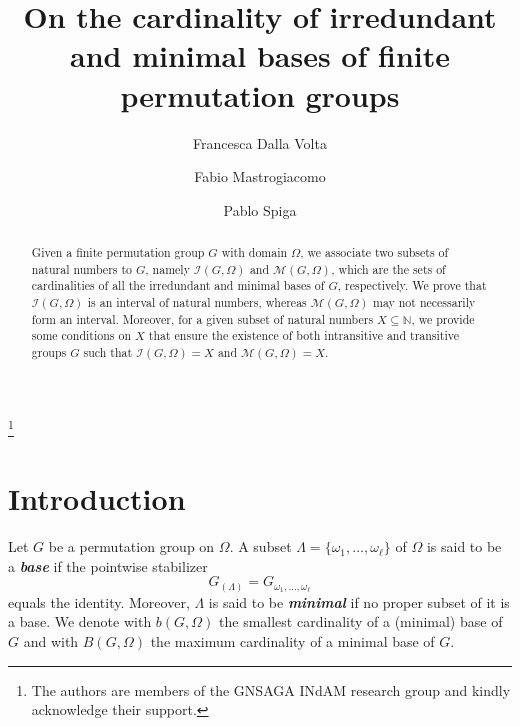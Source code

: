 \documentclass{amsart}
\begin{document}
	
	\title[Cardinality minimal bases]{On the cardinality of irredundant and minimal  bases of finite permutation groups}
	
	\author[F. Dalla Volta]{Francesca Dalla Volta}
	\address{Francesca Dalla Volta, Dipartimento di Matematica Pura e Applicata,\newline
		University of Milano-Bicocca, Via Cozzi 55, 20126 Milano, Italy} 
	
	
	\author[F. Mastrogiacomo]{Fabio Mastrogiacomo}
	\address{Fabio Mastrogiacomo, Dipartimento di Matematica ``Felice Casorati", University of Pavia, Via Ferrata 5, 27100 Pavia, Italy} 
	
	
	\author[P. Spiga]{Pablo Spiga}
	\address{Pablo Spiga, Dipartimento di Matematica Pura e Applicata,\newline
		University of Milano-Bicocca, Via Cozzi 55, 20126 Milano, Italy} 
	\thanks{The authors are members of the GNSAGA INdAM research group and kindly acknowledge their support.}
	\maketitle
	\begin{abstract}  
		Given a finite permutation group $G$ with domain $\Omega$, we associate two subsets of natural numbers to $G$, namely $\mathcal{I}(G,\Omega)$ and $\mathcal{M}(G,\Omega)$, which are the sets of cardinalities of all the irredundant and
		minimal bases of $G$, respectively. We prove that $\mathcal{I}(G,\Omega)$ is an interval of natural numbers, whereas $\mathcal{M}(G,\Omega)$ may not necessarily form an interval. Moreover, for a given subset of natural numbers $X \subseteq \mathbb{N}$, we provide some conditions on $X$ that ensure the existence of both intransitive and transitive groups $G$ such that 
		$\mathcal{I}(G,\Omega) = X$ and $\mathcal{M}(G,\Omega) = X$.
	\end{abstract}
	
	\section{Introduction}        	          
	Let $G$ be a permutation group on $\Omega$. A subset $\Lambda=\{\omega_1,\ldots,\omega_\ell\}$ of $\Omega$ is said to be a \textit{\textbf{base}} if the pointwise stabilizer $$G_{(\Lambda)}=G_{\omega_1,\ldots,\omega_\ell}$$
	equals the identity. Moreover, $\Lambda$ is said to be \textit{\textbf{minimal}} if no proper subset of it is a base. We denote with $b(G,\Omega)$ the smallest cardinality of a 
	(minimal) base of $G$ and with $B(G,\Omega)$ the maximum cardinality of a minimal base of $G$.
	
\end{document}
